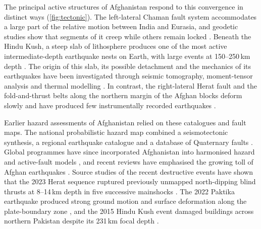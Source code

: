 \documentclass[11pt]{article}
\begin{document}
The principal active structures of Afghanistan respond to this convergence in
distinct ways (\cref{fig:tectonic}). The left-lateral Chaman fault system
accommodates a large part of the relative motion between India and Eurasia, and
geodetic studies show that segments of it creep while others remain locked
\cite{UlHadi2013, Fattahi2016, Barnhart2017, Dalaison2021}. Beneath the Hindu Kush,
a steep slab of lithosphere produces one of the most active intermediate-depth
earthquake nests on Earth, with large events at 150--250\,km depth
\cite{Pegler1998, Pavlis2000, Sippl2013, Schneider2013}. The origin of this slab,
its possible detachment and the mechanics of its earthquakes have been investigated
through seismic tomography, moment-tensor analysis and thermal modelling
\cite{Lister2008, Kufner2016, Kufner2017, Zhan2016, Poli2016, Molnar2019, Lou2009}.
In contrast, the right-lateral Herat fault and the fold-and-thrust belts along the
northern margin of the Afghan blocks deform slowly and have produced few
instrumentally recorded earthquakes \cite{Wheeler2005, Ruleman2007}.

Earlier hazard assessments of Afghanistan relied on these catalogues and fault maps.
The national probabilistic hazard map combined a seismotectonic synthesis, a
regional earthquake catalogue and a database of Quaternary faults
\cite{Boyd2007, Dewey2006, Wheeler2005, Ruleman2007}. Global programmes have since
incorporated Afghanistan into harmonised hazard and active-fault models
\cite{Giardini1999, Styron2020, Silva2020}, and recent reviews have emphasised the
growing toll of Afghan earthquakes \cite{Akhundzadah2025}. Source studies of the
recent destructive events have shown that the 2023 Herat sequence ruptured
previously unmapped north-dipping blind thrusts at 8--14\,km depth in five
successive mainshocks \cite{Zhao2025, Fu2025, Xu2025, Zhong2026, Toker2026}. The
2022 Paktika earthquake produced strong ground motion and surface deformation along
the plate-boundary zone \cite{Jahed2024}, and the 2015 Hindu Kush event damaged
buildings across northern Pakistan despite its 231\,km focal depth
\cite{Ismail2016}.
\end{document}
